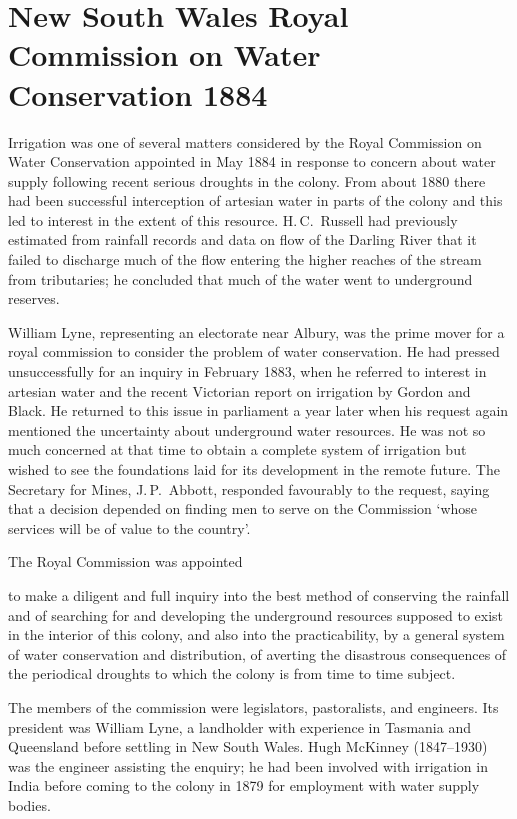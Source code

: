 \section*{New South Wales Royal Commission on Water Conservation 1884}

Irrigation was one of several matters considered by the Royal
Commission on Water Conservation appointed in May 1884 in response to
concern about water supply following recent serious droughts in the
colony.  From about 1880 there had been successful interception of
artesian water in parts of the colony and this led to interest in the
extent of this resource.  H.\,C.~Russell  had
previously estimated from rainfall records and data on flow of the
Darling River  that it failed to discharge much
of the flow entering the higher reaches of the stream from
tributaries; he concluded that much of the water went to underground
reserves.

William Lyne,  representing an electorate near Albury,
was the prime mover for a royal commission to consider the problem of
water conservation.  He had pressed unsuccessfully for an inquiry in
February 1883, when he referred to interest in artesian water and the
recent Victorian report on irrigation by Gordon and Black.  He
returned to this issue in parliament a year later when his request
again mentioned the uncertainty about underground water resources.  He
was not so much concerned at that time to obtain a complete system of
irrigation but wished to see the foundations laid for its development
in the remote future.  The Secretary for Mines, J.\,P.~Abbott,
 responded favourably to the request, saying
that a decision depended on finding men to serve on the Commission
`whose services will be of value to the country'.

The Royal Commission was appointed
\begin{Quote}
	to make a diligent and full inquiry into the best method of
	conserving the rainfall and of searching for and developing
	the underground resources supposed to exist in the interior of
	this colo\-ny, and also into the practicability, by a general
	system of water conservation and distribution, of averting the
	disastrous consequ\-en\-ces of the periodical droughts to which
	the colony is from time to time subject.
\end{Quote}
The members of the commission were legislators, pastoralists, and
engineers. Its president was William Lyne, a landholder with
experience in Tasmania and Queensland before settling in New South
Wales. Hugh McKinney  (1847--1930) was the
engineer assisting the enquiry; he had been involved with irrigation
in India before coming to the colony in 1879 for employment with water
supply bodies.

